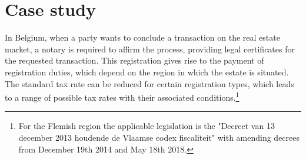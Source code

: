 \section{Case study}
\label{case}
In Belgium, when a party wants to conclude a transaction on the real estate
market, a notary is required to affirm the process, providing legal certificates for the requested transaction. 
This registration gives rise to the payment of registration duties, which depend on the region in which the estate is situated. 
The standard tax rate can be reduced for certain registration types, which leads to a range of possible tax rates with their associated conditions.\footnote{For the Flemish region the applicable legislation is the "Decreet van 13 december 2013 houdende de Vlaamse codex fiscaliteit" with amending decrees from December 19th 2014 and May 18th 2018.}

